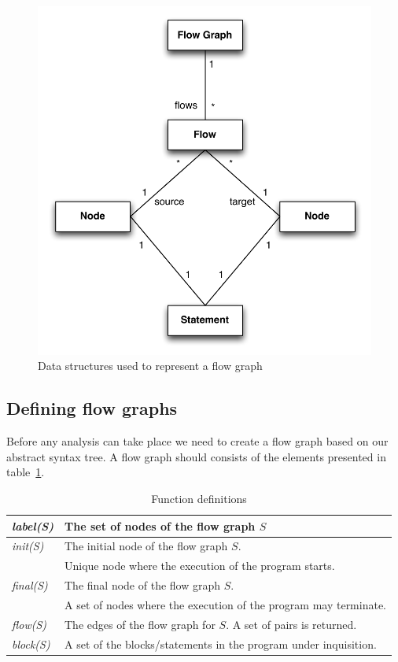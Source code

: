 \begin{figure}[h]
	\centering
	\includegraphics[scale=0.6]{../img/flow_graph}
	\caption{Data structures used to represent a flow graph}
	\label{fig:flowgraph}
\end{figure}

\subsection{Defining flow graphs}\label{section:CreatingFlowGraphs}
Before any analysis can take place we need to create a flow graph based on our abstract syntax tree. A flow graph should consists of the elements presented in table~\ref{table:flow_graph_definitions}.
\begin{table}
    \begin{tabular}{l | l }
    \textsl{label(S)} & The set of nodes of the flow graph $S$ \\
    \hline    
    \textsl{init(S)}  & The initial node of the flow graph $S$.\\
               & Unique node where the execution of the program starts.\\
    \hline
    \textsl{final(S)}   & The final node of the flow graph $S$.\\
                 & A set of nodes where the execution of the program may terminate.\\
    \hline
    \textsl{flow(S)} & The edges of the flow graph for $S$. A set of pairs is returned. \\
	\hline
    \textsl{block(S)}   & A set of the blocks/statements in the program under inquisition.\\
    \end{tabular}
    \centering
	\caption{Function definitions}
	\label{table:flow_graph_definitions}
\end{table}

